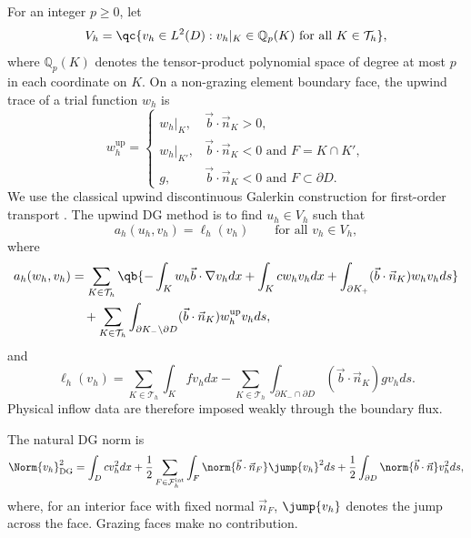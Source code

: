 \documentclass[final]{amsart}
\begin{document}
For an integer $p\geq 0$, let
\begin{equation}
V_h
=
\qc{v_h\in L^2(D):v_h|_K\in \mathbb{Q}_p(K)\text{ for all }K\in\mathcal{T}_h},
\label{eq:analysis_vh}
\end{equation}
where $\mathbb{Q}_p(K)$ denotes the tensor-product polynomial space of degree
at most $p$ in each coordinate on $K$. On a non-grazing element
boundary face, the upwind trace of a trial function $w_h$ is
\begin{equation}
w_h^{\mathrm{up}}
=
\begin{cases}
w_h|_K, & \vec b\cdot\vec n_K>0,\\
w_h|_{K'}, & \vec b\cdot\vec n_K<0\text{ and }F=K\cap K',\\
g, & \vec b\cdot\vec n_K<0\text{ and }F\subset\partial D.
\end{cases}
\label{eq:analysis_upwind_trace}
\end{equation}
We use the classical upwind discontinuous Galerkin construction for
first-order transport \cite{ReedHill1973,LesaintRaviart1974,
  JohnsonPitkaranta1986,Cockburn1998IntroDG}. The upwind DG method is
to find $u_h\in V_h$ such that
\begin{equation}
a_h(u_h,v_h)=\ell_h(v_h)
\qquad
\text{for all }v_h\in V_h,
\label{eq:analysis_dg_problem}
\end{equation}
where
\begin{equation}
\begin{split}
a_h(w_h,v_h)
&=
\sum_{K\in\mathcal{T}_h}
\qb{
-\int_K
w_h\vec b\cdot\nabla v_h dx
+
\int_K
c w_h v_h dx
+
\int_{\partial K_+}
(\vec b\cdot\vec n_K)w_h v_h ds
}
\\
&\quad+
\sum_{K\in\mathcal{T}_h}
\int_{\partial K_-\setminus\partial D}
(\vec b\cdot\vec n_K)w_h^{\mathrm{up}}v_h ds,
\end{split}
\label{eq:analysis_dg_bilinear}
\end{equation}
and
\begin{equation}
\ell_h(v_h)
=
\sum_{K\in\mathcal{T}_h}
\int_K f v_h dx
-
\sum_{K\in\mathcal{T}_h}
\int_{\partial K_-\cap\partial D}
(\vec b\cdot\vec n_K)g v_h ds.
\label{eq:analysis_dg_linear}
\end{equation}
Physical inflow data are therefore imposed weakly through the boundary
flux.

The natural DG norm is
\begin{equation}
\Norm{v_h}_{\mathrm{DG}}^2
=
\int_D c v_h^2 dx
+
\frac{1}{2}
\sum_{F\in\mathcal{F}_h^{\mathrm{int}}}
\int_F \norm{\vec b\cdot\vec n_F}\jump{v_h}^2 ds
+
\frac{1}{2}
\int_{\partial D}
\norm{\vec b\cdot\vec n}v_h^2 ds,
\label{eq:analysis_dg_norm}
\end{equation}
where, for an interior face with fixed normal $\vec n_F$, $\jump{v_h}$
denotes the jump across the face. Grazing faces make no contribution.
\end{document}
